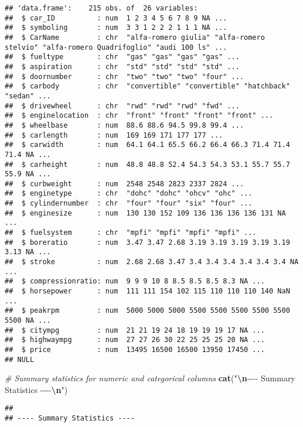 \documentclass[
]{article}
\newenvironment{Shaded}{\begin{snugshade}}{\end{snugshade}}
\newcommand{\CommentTok}[1]{\textcolor[rgb]{0.56,0.35,0.01}{\textit{#1}}}
\newcommand{\FunctionTok}[1]{\textcolor[rgb]{0.13,0.29,0.53}{\textbf{#1}}}
\newcommand{\NormalTok}[1]{#1}
\newcommand{\SpecialCharTok}[1]{\textcolor[rgb]{0.81,0.36,0.00}{\textbf{#1}}}
\newcommand{\StringTok}[1]{\textcolor[rgb]{0.31,0.60,0.02}{#1}}
\begin{document}
\begin{verbatim}
## 'data.frame':    215 obs. of  26 variables:
##  $ car_ID          : num  1 2 3 4 5 6 7 8 9 NA ...
##  $ symboling       : num  3 3 1 2 2 2 1 1 1 NA ...
##  $ CarName         : chr  "alfa-romero giulia" "alfa-romero stelvio" "alfa-romero Quadrifoglio" "audi 100 ls" ...
##  $ fueltype        : chr  "gas" "gas" "gas" "gas" ...
##  $ aspiration      : chr  "std" "std" "std" "std" ...
##  $ doornumber      : chr  "two" "two" "two" "four" ...
##  $ carbody         : chr  "convertible" "convertible" "hatchback" "sedan" ...
##  $ drivewheel      : chr  "rwd" "rwd" "rwd" "fwd" ...
##  $ enginelocation  : chr  "front" "front" "front" "front" ...
##  $ wheelbase       : num  88.6 88.6 94.5 99.8 99.4 ...
##  $ carlength       : num  169 169 171 177 177 ...
##  $ carwidth        : num  64.1 64.1 65.5 66.2 66.4 66.3 71.4 71.4 71.4 NA ...
##  $ carheight       : num  48.8 48.8 52.4 54.3 54.3 53.1 55.7 55.7 55.9 NA ...
##  $ curbweight      : num  2548 2548 2823 2337 2824 ...
##  $ enginetype      : chr  "dohc" "dohc" "ohcv" "ohc" ...
##  $ cylindernumber  : chr  "four" "four" "six" "four" ...
##  $ enginesize      : num  130 130 152 109 136 136 136 136 131 NA ...
##  $ fuelsystem      : chr  "mpfi" "mpfi" "mpfi" "mpfi" ...
##  $ boreratio       : num  3.47 3.47 2.68 3.19 3.19 3.19 3.19 3.19 3.13 NA ...
##  $ stroke          : num  2.68 2.68 3.47 3.4 3.4 3.4 3.4 3.4 3.4 NA ...
##  $ compressionratio: num  9 9 9 10 8 8.5 8.5 8.5 8.3 NA ...
##  $ horsepower      : num  111 111 154 102 115 110 110 110 140 NaN ...
##  $ peakrpm         : num  5000 5000 5000 5500 5500 5500 5500 5500 5500 NA ...
##  $ citympg         : num  21 21 19 24 18 19 19 19 17 NA ...
##  $ highwaympg      : num  27 27 26 30 22 25 25 25 20 NA ...
##  $ price           : num  13495 16500 16500 13950 17450 ...
## NULL
\end{verbatim}

\begin{Shaded}
\begin{Highlighting}[]
\CommentTok{\# Summary statistics for numeric and categorical columns}
\FunctionTok{cat}\NormalTok{(}\StringTok{"}\SpecialCharTok{\textbackslash{}n}\StringTok{{-}{-}{-}{-} Summary Statistics {-}{-}{-}{-}}\SpecialCharTok{\textbackslash{}n}\StringTok{"}\NormalTok{)}
\end{Highlighting}
\end{Shaded}

\begin{verbatim}
## 
## ---- Summary Statistics ----
\end{verbatim}
\end{document}
